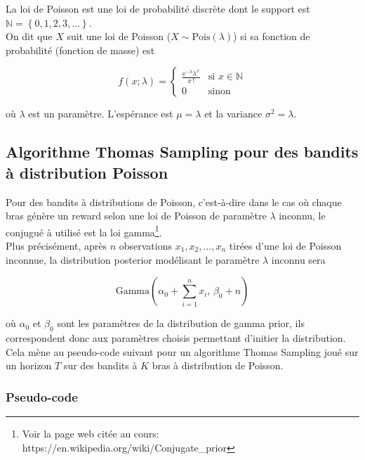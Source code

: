 \documentclass[letterpaper,11pt]{article}
\renewcommand{\exp}[1]{\mathrm{e}^{#1}}
\begin{document}
La loi de Poisson est une loi de probabilité discrète dont le support est $\mathbb{N}=\left\{0,1,2,3,...\right\}.$\\
On dit que $X$ suit une loi de Poisson ($X\sim\mathrm{Pois}(\lambda)$) si sa fonction de probabilité (fonction de masse) est

\begin{equation*}
f(x; \lambda) = 
\left\{
\begin{array}{cl}
\frac{\exp{-\lambda} \lambda^x}{x\,!} & \text{si } x\in\mathbb{N}\\[0.4cm]
0 & \text{sinon}
\end{array}
\right.
\end{equation*}

où $\lambda$ est un paramètre. L'espérance est $\mu=\lambda$ et la variance $\sigma^2=\lambda.$

\subsection{Algorithme Thomas Sampling pour des bandits à distribution Poisson }

Pour des bandits à distributions de Poisson, c'est-à-dire dans le cas où chaque bras génère un reward selon une loi de Poisson de paramètre $\lambda$ inconnu, le conjugué à utilisé est la loi gamma\footnote{Voir la page web citée au cours: https://en.wikipedia.org/wiki/Conjugate\_prior}.\\

Plus précisément, après $n$ observations $x_1,x_2,...,x_n$ tirées d'une loi de Poisson inconnue, la distribution posterior modélisant le paramètre $\lambda$ inconnu sera

\begin{equation}
\mathrm{Gamma}\left(\alpha_0 + \sum_{i=1}^n x_i,\,\beta_0 + n\right)
\end{equation}

où $\alpha_0$ et $\beta_0$ sont les paramètres de la distribution de gamma prior, ils correspondent donc aux paramètres choisis permettant d'initier la distribution.\\

Cela mène au pseudo-code suivant pour un algorithme Thomas Sampling joué sur un horizon $T$ sur des bandits à $K$ bras à distribution de Poisson.

\subsubsection{Pseudo-code}
\end{document}
